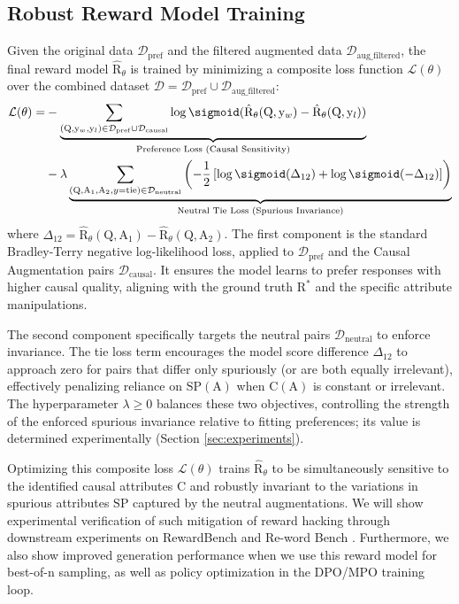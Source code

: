 \subsection{Robust Reward Model Training}
\label{subsec:training_phase}

Given the original data $\mathcal{D}_{\mathrm{pref}}$ and the filtered augmented data $\mathcal{D}_{\mathrm{aug\_filtered}}$, the final \carma{} reward model $\hat{\mathrm{R}}_\theta$ is trained by minimizing a composite loss function $\mathcal{L}(\theta)$ over the combined dataset $\mathcal{D} = \mathcal{D}_{\mathrm{pref}} \cup \mathcal{D}_{\mathrm{aug\_filtered}}$:
\begin{align}
\mathcal{L}(\theta) = &- \underbrace{\sum_{(\mathrm{Q}, \mathrm{y}_w, \mathrm{y}_l) \in \mathcal{D}_{\mathrm{pref}} \cup \mathcal{D}_{\mathrm{causal}}} \log \sigmoid(\hat{\mathrm{R}}_\theta(\mathrm{Q}, \mathrm{y}_w) - \hat{\mathrm{R}}_\theta(\mathrm{Q}, \mathrm{y}_l))}_{\text{Preference Loss (Causal Sensitivity)}} \nonumber \\
&- \lambda \underbrace{\sum_{(\mathrm{Q}, \mathrm{A}_1, \mathrm{A}_2, y=\text{tie})\in \mathcal{D}_{\mathrm{neutral}}} \left( -\frac{1}{2} \left[ \log \sigmoid(\Delta_{12}) + \log \sigmoid(-\Delta_{12}) \right] \right)}_{\text{Neutral Tie Loss (Spurious Invariance)}}
\label{eq:combined_loss_methodology}
\end{align}
where $\Delta_{12} = \hat{\mathrm{R}}_\theta(\mathrm{Q}, \mathrm{A}_1) - \hat{\mathrm{R}}_\theta(\mathrm{Q}, \mathrm{A}_2)$.
The first component is the standard Bradley-Terry negative log-likelihood loss, applied to $\mathcal{D}_{\mathrm{pref}}$ and the Causal Augmentation pairs $\mathcal{D}_{\mathrm{causal}}$. It ensures the model learns to prefer responses with higher causal quality, aligning with the ground truth $\mathrm{R}^*$ and the specific attribute manipulations.

The second component specifically targets the neutral pairs $\mathcal{D}_{\mathrm{neutral}}$ to enforce invariance. The tie loss term encourages the model score difference $\Delta_{12}$ to approach zero for pairs that differ only spuriously (or are both equally irrelevant), effectively penalizing reliance on $\mathrm{SP}(\mathrm{A})$ when $\mathrm{C}(\mathrm{A})$ is constant or irrelevant. The hyperparameter $\lambda \ge 0$ balances these two objectives, controlling the strength of the enforced spurious invariance relative to fitting preferences; its value is determined experimentally (Section \ref{sec:experiments}).

Optimizing this composite loss $\mathcal{L}(\theta)$ trains $\hat{\mathrm{R}}_\theta$ to be simultaneously sensitive to the identified causal attributes $\mathrm{C}$ and robustly invariant to the variations in spurious attributes $\mathrm{SP}$ captured by the neutral augmentations. We will show experimental verification of such mitigation of reward hacking through downstream experiments on RewardBench and Re-word Bench \citep{lambert2024rewardbench,wu2025rewordbench}. Furthermore, we also show improved generation performance when we use this reward model for best-of-n sampling, as well as policy optimization in the DPO/MPO training loop.